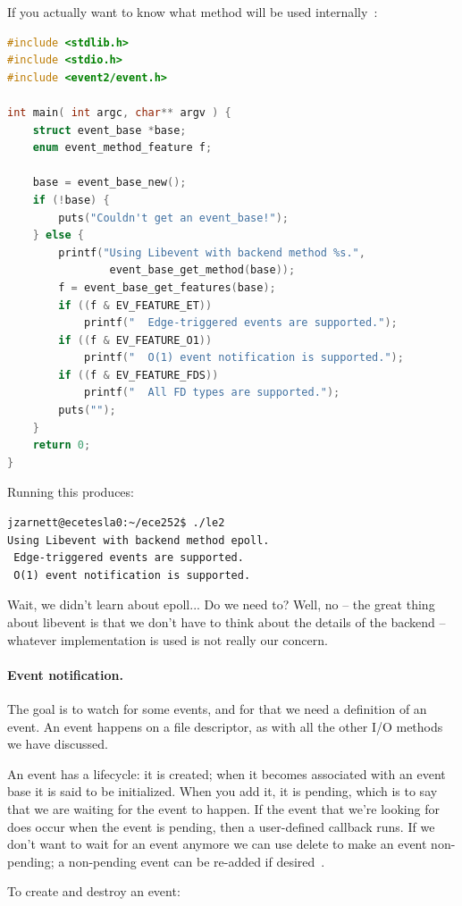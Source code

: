 \documentclass[a4paper]{report}
\begin{document}
If you actually want to know what method will be used internally~\cite{libevent}:
\begin{lstlisting}[language=C]
#include <stdlib.h>
#include <stdio.h>
#include <event2/event.h>

int main( int argc, char** argv ) { 
    struct event_base *base;
    enum event_method_feature f;

    base = event_base_new();
    if (!base) {
        puts("Couldn't get an event_base!");
    } else {
        printf("Using Libevent with backend method %s.",
                event_base_get_method(base));
        f = event_base_get_features(base);
        if ((f & EV_FEATURE_ET))
            printf("  Edge-triggered events are supported.");
        if ((f & EV_FEATURE_O1))
            printf("  O(1) event notification is supported.");
        if ((f & EV_FEATURE_FDS))
            printf("  All FD types are supported.");
        puts("");
    }   
    return 0;
}
\end{lstlisting}

Running this produces:
\begin{verbatim}
jzarnett@ecetesla0:~/ece252$ ./le2
Using Libevent with backend method epoll.  
 Edge-triggered events are supported.  
 O(1) event notification is supported.
\end{verbatim}

Wait, we didn't learn about epoll... Do we need to? Well, no -- the great thing about libevent is that we don't have to think about the details of the backend -- whatever implementation is used is not really our concern.

\paragraph{Event notification.} The goal is to watch for some events, and for that we need a definition of an event. An event happens on a file descriptor, as with all the other I/O methods we have discussed.

An event has a lifecycle: it is created; when it becomes associated with an event base it is said to be initialized. When you add it, it is pending, which is to say that we are waiting for the event to happen. If the event that we're looking for does occur when the event is pending, then a user-defined callback runs. If we don't want to wait for an event anymore we can use delete to make an event non-pending; a non-pending event can be re-added if desired~\cite{libevent}.

To create and destroy an event:
\end{document}
